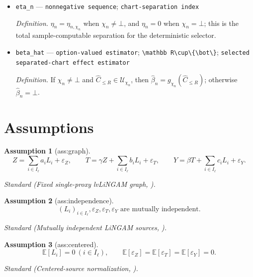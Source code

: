 \documentclass{article}
\newtheorem{assumption}{Assumption}
\begin{document}
\begin{itemize}
  \item \texttt{eta\_\allowbreak{}n} --- \texttt{nonnegative sequence}; \texttt{chart-\allowbreak{}separation index}
  \par\smallskip\noindent\emph{Definition.} \(\eta_n=\eta_{n,\chi_n}\) when \(\chi_n\ne\bot\), and \(\eta_n=0\) when \(\chi_n=\bot\); this is the total sample-computable separation for the deterministic selector.
  \item \texttt{beta\_\allowbreak{}hat} --- \texttt{option-\allowbreak{}valued estimator}; \texttt{\textbackslash{}\allowbreak{}mathbb R\textbackslash{}\allowbreak{}cup\textbackslash{}\allowbreak{}\{\textbackslash{}\allowbreak{}bot\textbackslash{}\allowbreak{}\}\allowbreak{}}; \texttt{selected separated-\allowbreak{}chart effect estimator}
  \par\smallskip\noindent\emph{Definition.} If \(\chi_n\ne\bot\) and \(\widehat C_{\le R}\in\mathcal U_{\chi_n}\), then \(\widehat\beta_n=g_{\chi_n}(\widehat C_{\le R})\); otherwise \(\widehat\beta_n=\bot\).
\end{itemize}

\section{Assumptions}

\begin{assumption}[ass:graph]\label{ass:graph}
\[Z=\sum_{i\in I_{\ell}}a_iL_i+\varepsilon_Z,\qquad T=\gamma Z+\sum_{i\in I_{\ell}}b_iL_i+\varepsilon_T,\qquad Y=\beta T+\sum_{i\in I_{\ell}}c_iL_i+\varepsilon_Y.\]
\par\smallskip\noindent\emph{Standard} (Fixed single-proxy lvLiNGAM graph, \cite{TramontanoKivvaSalehkaleybarKiyavashDrton2025}).
\end{assumption}

\begin{assumption}[ass:independence]\label{ass:independence}
\[(L_i)_{i\in I_{\ell}},\varepsilon_Z,\varepsilon_T,\varepsilon_Y\text{ are mutually independent}.\]
\par\smallskip\noindent\emph{Standard} (Mutually independent LiNGAM sources, \cite{TramontanoKivvaSalehkaleybarKiyavashDrton2025}).
\end{assumption}

\begin{assumption}[ass:centered]\label{ass:centered}
\[\mathbb E[L_i]=0\ (i\in I_{\ell}),\qquad\mathbb E[\varepsilon_Z]=\mathbb E[\varepsilon_T]=\mathbb E[\varepsilon_Y]=0.\]
\par\smallskip\noindent\emph{Standard} (Centered-source normalization, \cite{TramontanoKivvaSalehkaleybarKiyavashDrton2025}).
\end{assumption}
\end{document}
